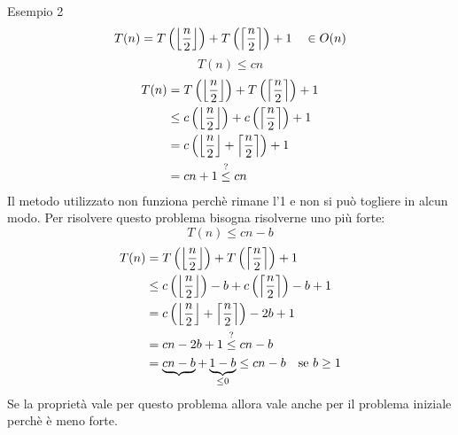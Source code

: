 \documentclass[a4paper]{article}
\begin{document}
\begin{examplebox}{Esempio 2}
  \[
    T(n) = T\left(\floor*{\frac{n}{2}}\right) + T\left(\ceil*{\frac{n}{2}}\right) + 1 \quad \in O(n)
  \]
  \[
  T(n) \le cn
  \]
  \[
  \begin{aligned}
    T(n) & = T\left(\floor*{\frac{n}{2}}\right) + T\left(\ceil*{\frac{n}{2}}\right) + 1\\
         & \le c\left(\floor*{\frac{n}{2}}\right) + c\left(\ceil*{\frac{n}{2}}\right) + 1\\
         & = c \left( \left\lfloor \frac{n}{2} \right\rfloor + \left\lceil \frac{n}{2} \right\rceil  \right) + 1\\
         & = cn + 1 \stackrel{?}{\le} cn
  \end{aligned}
  \]
  Il metodo utilizzato non funziona perchè rimane l'1 e non si può togliere in alcun modo.
  Per risolvere questo problema bisogna risolverne uno più forte:
  \[
  T(n) \le cn - b
  \]
  \[
  \begin{aligned}
    T(n) & = T\left(\floor*{\frac{n}{2}}\right) + T\left(\ceil*{\frac{n}{2}}\right) + 1\\
         & \le c\left(\floor*{\frac{n}{2}}\right) -b + c\left(\ceil*{\frac{n}{2}}\right) -b + 1\\
         & = c \left( \left\lfloor \frac{n}{2} \right\rfloor + \left\lceil \frac{n}{2} \right\rceil  \right) - 2b + 1\\
         & = cn - 2b + 1 \stackrel{?}{\le} cn - b\\
         & = \underbrace{cn - b} + \underbrace{1 - b}_{\le 0} \le cn - b \quad \text{se } b \ge 1\\
  \end{aligned}
  \]
  Se la proprietà vale per questo problema allora vale anche per il problema iniziale
  perchè è meno forte.
\end{examplebox}
\end{document}
